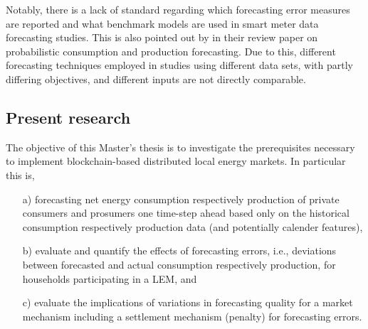Notably, there is a lack of standard regarding which forecasting error measures are reported and what benchmark models are used in smart meter data forecasting studies. This is also pointed out by \citet{Meer:2018} in their review paper on probabilistic consumption and production forecasting. Due to this, different forecasting techniques employed in studies using different data sets, with partly differing objectives, and different inputs are not directly comparable. 




\subsection{Present research}\label{Sec:Intro;Subsec:Present}

The objective of this Master's thesis is to investigate the prerequisites necessary to implement blockchain-based distributed local energy markets. In particular this is,
\begin{itemize}
    \item[a)] forecasting net energy consumption respectively production of private consumers and prosumers one time-step ahead based only on the historical consumption respectively production data (and potentially calender features),
    \item[b)] evaluate and quantify the effects of forecasting errors, i.e., deviations between forecasted and actual consumption respectively production, for households participating in a LEM, and
    \item[c)] evaluate the implications of variations in forecasting quality for a market mechanism including a settlement mechanism (penalty) for forecasting errors.
\end{itemize}

